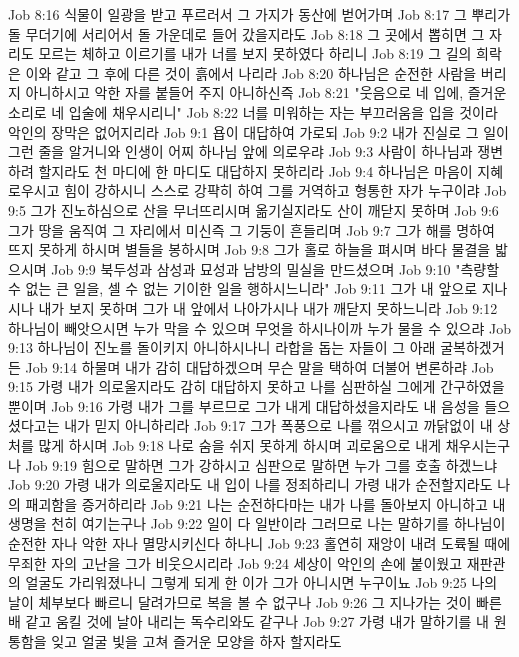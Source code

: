 Job 8:16  식물이 일광을 받고 푸르러서 그 가지가 동산에 벋어가며
Job 8:17  그 뿌리가 돌 무더기에 서리어서 돌 가운데로 들어 갔을지라도
Job 8:18  그 곳에서 뽑히면 그 자리도 모르는 체하고 이르기를 내가 너를 보지 못하였다 하리니
Job 8:19  그 길의 희락은 이와 같고 그 후에 다른 것이 흙에서 나리라
Job 8:20  하나님은 순전한 사람을 버리지 아니하시고 악한 자를 붙들어 주지 아니하신즉
Job 8:21  "웃음으로 네 입에, 즐거운 소리로 네 입술에 채우시리니"
Job 8:22  너를 미워하는 자는 부끄러움을 입을 것이라 악인의 장막은 없어지리라
Job 9:1  욥이 대답하여 가로되
Job 9:2  내가 진실로 그 일이 그런 줄을 알거니와 인생이 어찌 하나님 앞에 의로우랴
Job 9:3  사람이 하나님과 쟁변하려 할지라도 천 마디에 한 마디도 대답하지 못하리라
Job 9:4  하나님은 마음이 지혜로우시고 힘이 강하시니 스스로 강퍅히 하여 그를 거역하고 형통한 자가 누구이랴
Job 9:5  그가 진노하심으로 산을 무너뜨리시며 옮기실지라도 산이 깨닫지 못하며
Job 9:6  그가 땅을 움직여 그 자리에서 미신즉 그 기둥이 흔들리며
Job 9:7  그가 해를 명하여 뜨지 못하게 하시며 별들을 봉하시며
Job 9:8  그가 홀로 하늘을 펴시며 바다 물결을 밟으시며
Job 9:9  북두성과 삼성과 묘성과 남방의 밀실을 만드셨으며
Job 9:10  "측량할 수 없는 큰 일을, 셀 수 없는 기이한 일을 행하시느니라"
Job 9:11  그가 내 앞으로 지나시나 내가 보지 못하며 그가 내 앞에서 나아가시나 내가 깨닫지 못하느니라
Job 9:12  하나님이 빼앗으시면 누가 막을 수 있으며 무엇을 하시나이까 누가 물을 수 있으랴
Job 9:13  하나님이 진노를 돌이키지 아니하시나니 라합을 돕는 자들이 그 아래 굴복하겠거든
Job 9:14  하물며 내가 감히 대답하겠으며 무슨 말을 택하여 더불어 변론하랴
Job 9:15  가령 내가 의로울지라도 감히 대답하지 못하고 나를 심판하실 그에게 간구하였을 뿐이며
Job 9:16  가령 내가 그를 부르므로 그가 내게 대답하셨을지라도 내 음성을 들으셨다고는 내가 믿지 아니하리라
Job 9:17  그가 폭풍으로 나를 꺾으시고 까닭없이 내 상처를 많게 하시며
Job 9:18  나로 숨을 쉬지 못하게 하시며 괴로움으로 내게 채우시는구나
Job 9:19  힘으로 말하면 그가 강하시고 심판으로 말하면 누가 그를 호출 하겠느냐
Job 9:20  가령 내가 의로울지라도 내 입이 나를 정죄하리니 가령 내가 순전할지라도 나의 패괴함을 증거하리라
Job 9:21  나는 순전하다마는 내가 나를 돌아보지 아니하고 내 생명을 천히 여기는구나
Job 9:22  일이 다 일반이라 그러므로 나는 말하기를 하나님이 순전한 자나 악한 자나 멸망시키신다 하나니
Job 9:23  홀연히 재앙이 내려 도륙될 때에 무죄한 자의 고난을 그가 비웃으시리라
Job 9:24  세상이 악인의 손에 붙이웠고 재판관의 얼굴도 가리워졌나니 그렇게 되게 한 이가 그가 아니시면 누구이뇨
Job 9:25  나의 날이 체부보다 빠르니 달려가므로 복을 볼 수 없구나
Job 9:26  그 지나가는 것이 빠른 배 같고 움킬 것에 날아 내리는 독수리와도 같구나
Job 9:27  가령 내가 말하기를 내 원통함을 잊고 얼굴 빛을 고쳐 즐거운 모양을 하자 할지라도
